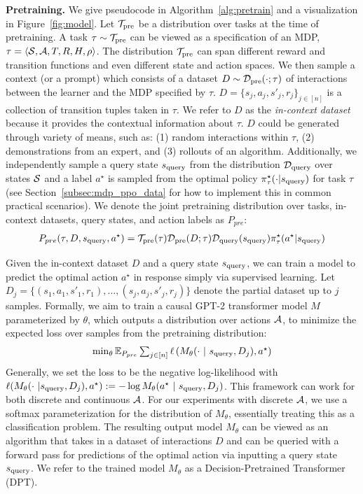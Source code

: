 \documentclass{article}
\begin{document}
\textbf{Pretraining.} We give pseudocode in Algorithm~\ref{alg:pretrain} and a visualization in Figure~\ref{fig:model}. Let ${\mathcal{T}}_{\text{pre}}$ be a distribution over tasks at the time of pretraining. A task $\tau \sim {\mathcal{T}}_{\text{pre}}$ can be viewed as a specification of an MDP,
$\tau = \langle
{\mathcal{S}}, \mathcal{A}, T, R, H, \rho \rangle$. The distribution ${\mathcal{T}}_{\text{pre}}$ can %
span different reward and transition functions and even different state and action spaces. We then sample a context (or a prompt) which consists of a dataset $D \sim \mathcal{D}_{\text{pre}}(\cdot; \tau)$ of interactions between the learner and the MDP specified by $\tau$. $D = \{s_j,a_j, s'_j, r_j\}_{j \in [n]}$ is a collection of transition tuples taken in $\tau$. 
We refer to $D$ as the \emph{in-context dataset} because it provides the contextual information about $\tau$. $D$ could be generated through variety of means, such as:
   (1) random interactions within $\tau$,
    (2) demonstrations from an expert,
     and (3) rollouts of an algorithm.
Additionally, we independently sample a query state $s_{\text{query}}$ from the distribution $\mathcal{D}_{\text{query}}$ over states ${\mathcal{S}}$ and a label $a^\star$ is sampled from the optimal policy $\pi^{\star}_\tau(\cdot | s_{\text{query}})$ 
for task $\tau$ (see Section~\ref{subsec:mdp_ppo_data} for how to implement this in common practical scenarios). 
 We denote the joint pretraining distribution over tasks, in-context datasets,  query states, and action labels as $P_{pre}$:
\begin{align}
    P_{pre}(\tau, D, s_{\text{query}}, a^\star) = {\mathcal{T}}_{\text{pre}}(\tau) \mathcal{D}_{\text{pre}}( D; \tau) \mathcal{D}_{\text{query}}(s_{\text{query}} ) \pi^{\star}_\tau( a^\star | s_{\text{query}})
\end{align}

Given the 
in-context dataset $D$ and a query state $s_{\text{query}}$, we can train a model to predict the optimal action $a^\star$ in response simply via supervised learning. Let $D_j = \{ (s_1, a_1, s'_1, r_1), \ldots, (s_j, a_j, s'_j, r_j) \}$ denote the partial dataset up to $j$ samples. Formally, we aim to train a causal GPT-2 transformer model $M$ parameterized by $\theta$, which outputs a distribution over actions $\mathcal{A}$, to minimize the expected loss over samples from the pretraining distribution:
\begin{align}\label{eq:pretrain-obj}
{\textstyle \min_{\theta}  \mathbb{E}_{P_{pre}}  \sum_{j \in [n]} \ell \left( M_{\theta} (  \cdot \ | \ s_{\text{query}}, D_j), a^\star \right)} 
\end{align}
Generally, we set the loss to be the negative log-likelihood with $\ell( M_{\theta}( \cdot \ | \squery, D_j), a^\star)  := -\log M_{\theta}(a^\star \ | \ \squery, D_j)$. This framework can work for both discrete and continuous $\mathcal{A}$. For our experiments with discrete $\mathcal{A}$, we use a softmax parameterization for the distribution of $M_{\theta}$, essentially treating this as a classification problem.
The resulting output model $M_{\theta}$ can be viewed as an algorithm that takes in a dataset of interactions $D$ and can be queried with a forward pass for predictions of the optimal action via inputting a query state $s_{\text{query}}$. We refer to the trained model $M_{\theta}$ as a Decision-Pretrained Transformer (DPT).
\end{document}
